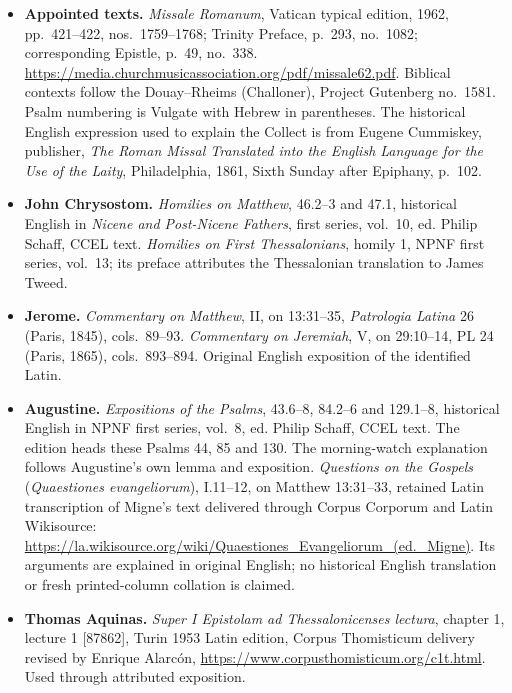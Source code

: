 \begin{itemize}
\item \textbf{Appointed texts.} \textit{Missale Romanum}, Vatican typical edition, 1962, pp.~421--422, nos.~1759--1768; Trinity Preface, p.~293, no.~1082; corresponding Epistle, p.~49, no.~338. \url{https://media.churchmusicassociation.org/pdf/missale62.pdf}. Biblical contexts follow the Douay--Rheims (Challoner), Project Gutenberg no.~1581. Psalm numbering is Vulgate with Hebrew in parentheses. The historical English expression used to explain the Collect is from Eugene Cummiskey, publisher, \textit{The Roman Missal Translated into the English Language for the Use of the Laity}, Philadelphia, 1861, Sixth Sunday after Epiphany, p.~102.

\item \textbf{John Chrysostom.} \textit{Homilies on Matthew}, 46.2--3 and 47.1, historical English in \textit{Nicene and Post-Nicene Fathers}, first series, vol.~10, ed. Philip Schaff, CCEL text. \textit{Homilies on First Thessalonians}, homily 1, NPNF first series, vol.~13; its preface attributes the Thessalonian translation to James Tweed.

\item \textbf{Jerome.} \textit{Commentary on Matthew}, II, on 13:31--35, \textit{Patrologia Latina} 26 (Paris, 1845), cols.~89--93. \textit{Commentary on Jeremiah}, V, on 29:10--14, PL 24 (Paris, 1865), cols.~893--894. Original English exposition of the identified Latin.

\item \textbf{Augustine.} \textit{Expositions of the Psalms}, 43.6--8, 84.2--6 and 129.1--8, historical English in NPNF first series, vol.~8, ed. Philip Schaff, CCEL text. The edition heads these Psalms 44, 85 and 130. The morning-watch explanation follows Augustine's own lemma and exposition. \textit{Questions on the Gospels} (\textit{Quaestiones evangeliorum}), I.11--12, on Matthew 13:31--33, retained Latin transcription of Migne's text delivered through Corpus Corporum and Latin Wikisource: \url{https://la.wikisource.org/wiki/Quaestiones_Evangeliorum_(ed._Migne)}. Its arguments are explained in original English; no historical English translation or fresh printed-column collation is claimed.

\item \textbf{Thomas Aquinas.} \textit{Super I Epistolam ad Thessalonicenses lectura}, chapter 1, lecture 1 [87862], Turin 1953 Latin edition, Corpus Thomisticum delivery revised by Enrique Alarcón, \url{https://www.corpusthomisticum.org/c1t.html}. Used through attributed exposition.


\end{itemize}

